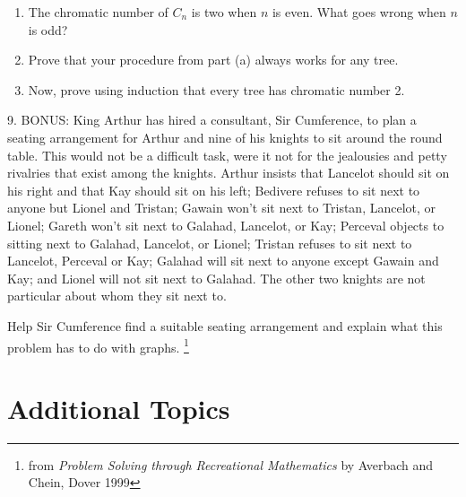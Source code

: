 \documentclass[10pt,]{book}
\theoremstyle{plain}
\theoremstyle{definition}
\theoremstyle{definition}
\theoremstyle{definition}
\numberwithin{equation}{chapter}
\begin{document}
\begin{exerciselist}
\begin{enumerate}[label=(\alph*)]
\item\hypertarget{li-1315}{}
                The chromatic number of \(C_n\) is two when \(n\) is even. What goes wrong when \(n\) is odd?
\item\hypertarget{li-1316}{}
                Prove that your procedure from part (a) always works for any tree.


\item\hypertarget{li-1317}{}
                Now, prove using induction that every tree has chromatic number 2.


\end{enumerate}
\par\smallskip
\item[9.]\hypertarget{exercise-321}{}
            BONUS: King Arthur has hired a consultant, Sir Cumference, to plan a seating arrangement for Arthur and nine of his knights to sit around the round table. This would not be a difficult task, were it not for the jealousies and petty rivalries that exist among the knights. Arthur insists that Lancelot should sit on his right and that Kay should sit on his left; Bedivere refuses to sit next to anyone but Lionel and Tristan; Gawain won't sit next to Tristan, Lancelot, or Lionel; Gareth won't sit next to Galahad, Lancelot, or Kay; Perceval objects to sitting next to Galahad, Lancelot, or Lionel; Tristan refuses to sit next to Lancelot, Perceval or Kay; Galahad will sit next to anyone except Gawain and Kay; and Lionel will not sit next to Galahad. The other two knights are not particular about whom they sit next to.
\par

            Help Sir Cumference find a suitable seating arrangement and explain what this problem has to do with graphs.
            \footnote{from \emph{Problem Solving through Recreational Mathematics} by Averbach and Chein, Dover 1999\label{fn-19}}
\par\smallskip
\end{exerciselist}
\typeout{************************************************}
\typeout{************************************************}
\chapter[Additional Topics]{Additional Topics}\label{ch_additionalTopics}
\typeout{************************************************}
\typeout{************************************************}
\end{document}

